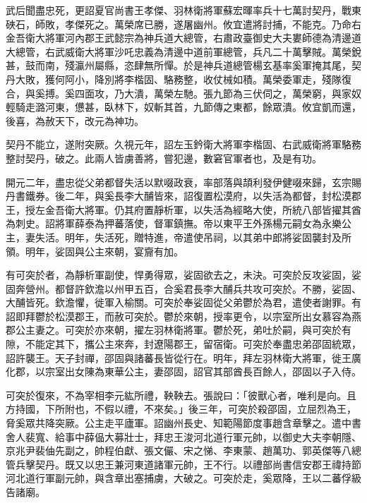 \begin{pinyinscope}
 武后聞盡忠死，更詔夏官尚書王孝傑、羽林衛將軍蘇宏暉率兵十七萬討契丹，戰東硤石，師敗，孝傑死之。萬榮席已勝，遂屠幽州。攸宜遣將討捕，不能克。乃命右金吾衛大將軍河內郡王武懿宗為神兵道大總管，右肅政臺御史大夫婁師德為清邊道大總管，右武威衛大將軍沙吒忠義為清邊中道前軍總管，兵凡二十萬擊賊。萬榮銳甚，鼓而南，殘瀛州屬縣，恣肆無所憚。於是神兵道總管楊玄基率奚軍掩其尾，契丹大敗，獲何阿小，降別將李楷固、駱務整，收仗械如積。萬榮委軍走，殘隊復合，與奚搏。奚四面攻，乃大潰，萬榮左馳。張九節為三伏伺之，萬榮窮，與家奴輕騎走潞河東，憊甚，臥林下，奴斬其首，九節傳之東都，餘眾潰。攸宜凱而還，後喜，為赦天下，改元為神功。



 契丹不能立，遂附突厥。久視元年，詔左玉鈐衛大將軍李楷固、右武威衛將軍駱務整討契丹，破之。此兩人皆虜善將，嘗犯邊，數窘官軍者也，及是有功。



 開元二年，盡忠從父弟都督失活以默啜政衰，率部落與頡利發伊健啜來歸，玄宗賜丹書鐵券。後二年，與奚長李大酺皆來，詔復置松漠府，以失活為都督，封松漠郡王，授左金吾衛大將軍。仍其府置靜析軍，以失活為經略大使，所統八部皆擢其酋為刺史。詔將軍薛泰為押蕃落使，督軍鎮撫。帝以東平王外孫楊元嗣女為永樂公主，妻失活。明年，失活死，贈特進，帝遣使吊祠，以其弟中郎將娑固襲封及所領。明年，娑固與公主來朝，宴齎有加。



 有可突於者，為靜析軍副使，悍勇得眾，娑固欲去之，未決。可突於反攻娑固，娑固奔營州。都督許欽澹以州甲五百，合奚君長李大酺兵共攻可突於。不勝，娑固、大酺皆死。欽澹懼，徙軍入榆關。可突於奉娑固從父弟鬱於為君，遣使者謝罪。有詔即拜鬱於松漠郡王，而赦可突於。鬱於來朝，授率更令，以宗室所出女慕容為燕郡公主妻之。可突於亦來朝，擢左羽林衛將軍。鬱於死，弟吐於嗣，與可突於有隙，不能定其下，攜公主來奔，封遼陽郡王，留宿衛。可突於奉盡忠弟邵固統眾，詔許襲王。天子封禪，邵固與諸蕃長皆從行在。明年，拜左羽林衛大將軍，徙王廣化郡，以宗室出女陳為東華公主，妻邵固，詔官其部酋長百餘人，邵固以子入侍。



 可突於復來，不為宰相李元紘所禮，鞅鞅去。張說曰：「彼獸心者，唯利是向。且方持國，下所附也，不假以禮，不來矣。」後三年，可突於殺邵固，立屈烈為王，脅奚眾共降突厥。公主走平廬軍。詔幽州長史、知範陽節度事趙含章擊之。遣中書舍人裴寬、給事中薛偘大募壯士，拜忠王浚河北道行軍元帥，以御史大夫李朝隱、京兆尹裴伷先副之，帥程伯獻、張文儼、宋之悌、李東蒙、趙萬功、郭英傑等八總管兵擊契丹。既又以忠王兼河東道諸軍元帥，王不行。以禮部尚書信安郡王禕持節河北道行軍副元帥，與含章出塞捕虜，大破之。可突於走，奚眾降，王以二蕃俘級告諸廟。




\end{pinyinscope}
